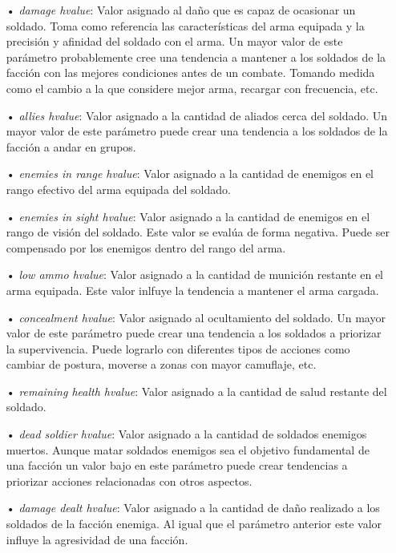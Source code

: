 \documentclass[twoside]{article}
\begin{document}
		\begin{itemize}
			\item[•] \emph{damage hvalue}: Valor asignado al da\~no que es capaz de ocasionar un soldado. Toma como referencia las caracter\'isticas del arma equipada y la precisi\'on y afinidad del soldado con el arma. Un mayor valor de este par\'ametro probablemente cree una tendencia a mantener a los soldados de la facci\'on con las mejores condiciones antes de un combate. Tomando medida como el cambio a la que considere mejor arma, recargar con frecuencia, etc.
			\item[•] \emph{allies hvalue}: Valor asignado a la cantidad de aliados cerca del soldado. Un mayor valor de este par\'ametro
			puede crear una tendencia a los soldados de la facci\'on a andar en grupos.
			\item[•] \emph{enemies in range hvalue}: Valor asignado a la cantidad de enemigos en el rango efectivo del arma equipada del soldado.
			\item[•] \emph{enemies in sight hvalue}: Valor asignado a la cantidad de enemigos en el rango de visi\'on del soldado. Este valor se eval\'ua de forma negativa. Puede ser compensado por los enemigos dentro del rango del arma.
			\item[•] \emph{low ammo hvalue}: Valor asignado a la cantidad de munici\'on restante en el arma equipada. Este valor inlfuye la tendencia a mantener el arma cargada.
			\item[•] \emph{concealment hvalue}: Valor asignado al ocultamiento del soldado. Un mayor valor de este par\'ametro puede crear una tendencia a los soldados a priorizar la supervivencia. Puede lograrlo con diferentes tipos de acciones como cambiar de postura, moverse a zonas con mayor camuflaje, etc.
			\item[•] \emph{remaining health hvalue}: Valor asignado a la cantidad de salud restante del soldado.
			\item[•] \emph{dead soldier hvalue}: Valor asignado a la cantidad de soldados enemigos muertos. Aunque matar soldados enemigos sea el objetivo fundamental de una facci\'on un valor bajo en este par\'ametro puede crear tendencias a priorizar acciones relacionadas con otros aspectos.
			\item[•] \emph{damage dealt hvalue}: Valor asignado a la cantidad de da\~no realizado a los soldados de la facci\'on enemiga. Al igual que el par\'ametro anterior este valor influye la agresividad de una facci\'on.
			
		\end{itemize}
		
\end{document}
